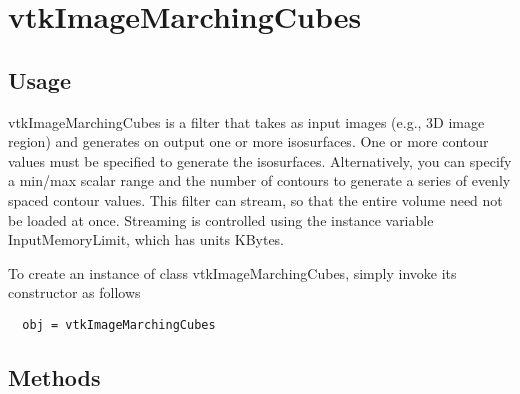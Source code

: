 \section{vtkImageMarchingCubes}

\subsection{Usage}

 vtkImageMarchingCubes is a filter that takes as input images (e.g., 3D
 image region) and generates on output one or more isosurfaces.
 One or more contour values must be specified to generate the isosurfaces.
 Alternatively, you can specify a min/max scalar range and the number of
 contours to generate a series of evenly spaced contour values.
 This filter can stream, so that the entire volume need not be loaded at
 once.  Streaming is controlled using the instance variable
 InputMemoryLimit, which has units KBytes.

To create an instance of class vtkImageMarchingCubes, simply
invoke its constructor as follows
\begin{verbatim}
  obj = vtkImageMarchingCubes
\end{verbatim}
\subsection{Methods}

